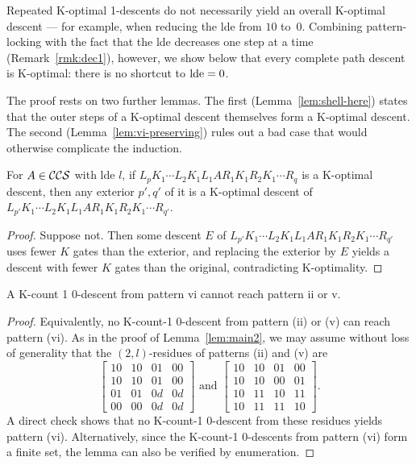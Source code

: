 \documentclass[reprint,amsmath,amssymb,aps,pra]{revtex4-2}
\begin{document}
Repeated K-optimal 1-descents do not necessarily yield an overall
K-optimal descent — for example, when reducing the lde from $10$
to~$0$. Combining pattern-locking with the fact that the lde decreases
one step at a time (Remark~\ref{rmk:dec1}), however, we show below
that every complete path descent is K-optimal: there is no shortcut to
$\operatorname{lde} = 0$.

The proof rests on two further lemmas. The first
(Lemma~\ref{lem:shell-here}) states that the outer steps of a
K-optimal descent themselves form a K-optimal descent. The second
(Lemma~\ref{lem:vi-preserving}) rules out a bad case that would
otherwise complicate the induction.

\begin{lemma}
  \label{lem:shell-here}
  For $A \in {\mathcal{CCS}}$ with lde $l$, if
  $L_pK_1\cdots L_2K_1L_1AR_1K_1R_2K_1\cdots R_q$ is a K-optimal
  descent, then any exterior $p',q'$ of it is a K-optimal descent of
  $L_{p'}K_1\cdots L_2K_1L_1AR_1K_1R_2K_1\cdots R_{q'}$.
\end{lemma}

\begin{proof}
  Suppose not. Then some descent $E$ of
  $L_{p'}K_1\cdots L_2K_1L_1AR_1K_1R_2K_1\cdots R_{q'}$ uses fewer $K$
  gates than the exterior, and replacing the exterior by $E$ yields a
  descent with fewer $K$ gates than the original, contradicting
  K-optimality.
\end{proof}

\begin{lemma}
  \label{lem:vi-preserving}
  A K-count 1 0-descent from pattern vi cannot reach pattern ii or v.
\end{lemma}

\begin{proof}
  Equivalently, no K-count-1 0-descent from pattern (ii) or (v) can
  reach pattern (vi). As in the proof of Lemma~\ref{lem:main2}, we may
  assume without loss of generality that the $(2,l)$-residues of
  patterns (ii) and (v) are
  \[
    \begin{bmatrix}
      10 & 10 & 01 & 00 \\
      10 & 10 & 01 & 00 \\
      01 & 01 & 0d & 0d \\
      00 & 00 & 0d & 0d
    \end{bmatrix} \text{ and }
    \begin{bmatrix}
      10 & 10 & 01 & 00 \\
      10 & 10 & 00 & 01 \\
      10 & 11 & 10 & 11 \\
      10 & 11 & 11 & 10
    \end{bmatrix}.
  \]
  A direct check shows that no K-count-1 0-descent from these residues
  yields pattern (vi). Alternatively, since the K-count-1 0-descents
  from pattern (vi) form a finite set, the lemma can also be verified
  by enumeration.
\end{proof}
\end{document}
